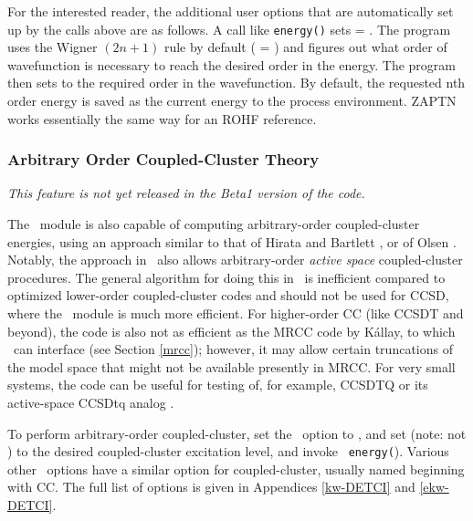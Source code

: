 For the interested reader, the additional user options that are
automatically set up by the calls above are as follows.  A call like
{\tt energy(\qq)} sets  = .
The program uses the Wigner $(2n+1)$ rule by default (
= ) and figures out what order of wavefunction is
necessary to reach the desired order in the energy.  The program then
sets  to the required order in the wavefunction.
By default, the requested n{th} order energy is saved as the current
energy to the process environment.   ZAPTN works essentially the same
way for an ROHF reference.

\subsubsection{Arbitrary Order Coupled-Cluster Theory} 
{\em This feature is not yet released in the Beta1 version of the code.}

The \PSIdetci\ module is also capable of computing arbitrary-order
coupled-cluster energies, using an approach similar to that of Hirata
and Bartlett \cite{Hirata:2000:216}, or of Olsen \cite{Olsen:2000:7140}.
Notably, the approach in \PSIdetci\ also allows arbitrary-order {\em
active space} coupled-cluster procedures.  The general algorithm
for doing this in \PSIdetci\ is inefficient compared to optimized
lower-order coupled-cluster codes and should not be used for CCSD,
where the \PSIccenergy\ module is much more efficient.  For higher-order
CC (like CCSDT and beyond), the code is also not as efficient as the
MRCC code by K{\'a}llay, to which \PSIfour\ can interface (see Section
\ref{mrcc}); however, it may allow certain truncations of the model
space that might not be available presently in MRCC.  For very small
systems, the code can be useful for testing of, for example, CCSDTQ or
its active-space CCSDtq analog \cite{Piecuch:1999:6103}.

To perform arbitrary-order coupled-cluster, set the \PSIdetci\
option  to , and set
 (note: not )
to the desired coupled-cluster excitation level, and invoke {\tt
energy(\qq{detci}\qq}).  Various other \PSIdetci\ options have a similar
option for coupled-cluster, usually named beginning with CC.  The full
list of options is given in Appendices \ref{kw-DETCI} and \ref{ekw-DETCI}.



